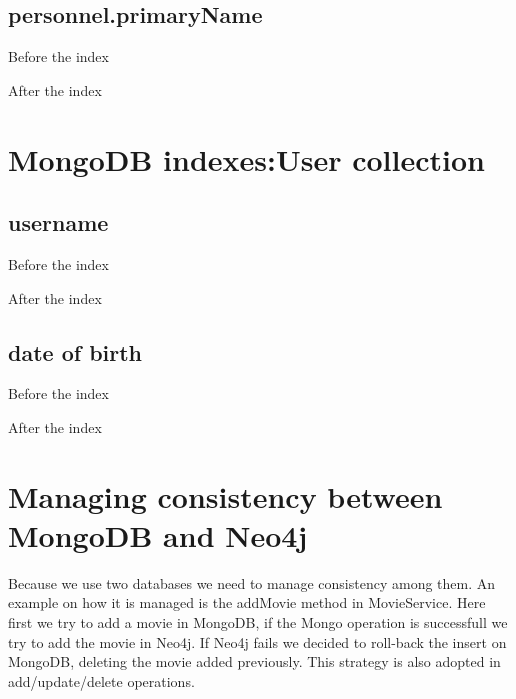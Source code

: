 \begin{alphasection}
\subsection{personnel.primaryName}
Before the index

After the index

\section{MongoDB indexes:User collection}
\subsection{username}
Before the index

After the index

\subsection{date of birth}
Before the index

After the index

\section{Managing consistency between MongoDB and Neo4j}
Because we use two databases we need to manage consistency among them. An example on how it is managed is the addMovie method in MovieService. Here first we try to add a movie in MongoDB, if the Mongo operation is successfull we try to add the movie in Neo4j. If Neo4j fails we decided to roll-back the insert on MongoDB, deleting the movie added previously. This strategy is also adopted in add/update/delete operations.

\end{alphasection}
